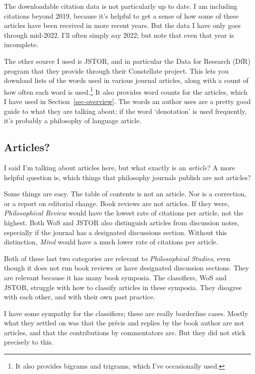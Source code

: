 \documentclass[
  10pt,
  letterpaper,
  DIV=11,
  numbers=noendperiod,
  twoside]{scrartcl}
\begin{document}
The downloadable citation data is not particularly up to date. I am
including citations beyond 2019, because it's helpful to get a sense of
how some of these articles have been received in more recent years. But
the data I have only goes through mid-2022. I'll often simply say 2022;
but note that even that year is incomplete.

The other source I used is JSTOR, and in particular the Data for
Research (DfR) program that they provide through their Constellate
project. This lets you download lists of the words used in various
journal articles, along with a count of how often each word is
used.\footnote{It also provides bigrams and trigrams, which I've
  occasionally used.} It also provides word counts for the articles,
which I have used in Section~\ref{sec-overview}. The words an author
uses are a pretty good guide to what they are talking about; if the word
`denotation' is used frequently, it's probably a philosophy of language
article.

\subsection{Articles?}\label{sec-what-is-an-article}

I said I'm talking about articles here, but what exactly is an
\emph{article}? A more helpful question is, which things that philosophy
journals publish are not articles?

Some things are easy. The table of contents is not an article. Nor is a
correction, or a report on editorial change. Book reviews are not
articles. If they were, \emph{Philosophical Review} would have the
lowest rate of citations per article, not the highest. Both WoS and
JSTOR also distinguish articles from discussion notes, especially if the
journal has a designated discussions section. Without this distinction,
\emph{Mind} would have a much lower rate of citations per article.

Both of these last two categories are relevant to \emph{Philosophical
Studies}, even though it does not run book reviews or have designated
discussion sections. They are relevant because it has many book
symposia. The classifiers, WoS and JSTOR, struggle with how to classify
articles in these symposia. They disagree with each other, and with
their own past practice.

I have some sympathy for the classifiers; these are really borderline
cases. Mostly what they settled on was that the précis and replies by
the book author are not articles, and that the contributions by
commentators are. But they did not stick precisely to this.
\end{document}
